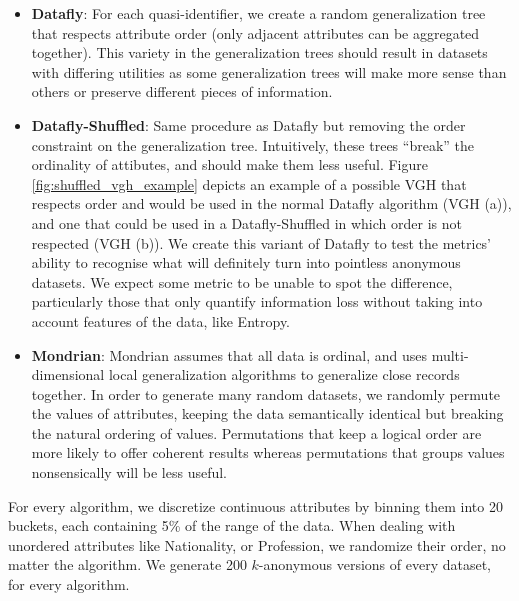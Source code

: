 \begin{itemize}
    \item \textbf{Datafly}: For each quasi-identifier, we create a random generalization tree that respects attribute order (only adjacent attributes can be aggregated together). This variety in the generalization trees should result in datasets with differing utilities as some generalization trees will make more sense than others or preserve different pieces of information.
    
    \item \textbf{Datafly-Shuffled}: Same procedure as Datafly but removing the order constraint on the generalization tree. Intuitively, these trees ``break'' the ordinality of attibutes, and should make them less useful. Figure \ref{fig:shuffled_vgh_example} depicts an example of a possible VGH that respects order and would be used in the normal Datafly algorithm (VGH (a)), and one that could be used in a Datafly-Shuffled in which order is not respected (VGH (b)). We create this variant of Datafly to test the metrics' ability to recognise what will definitely turn into pointless anonymous datasets. We expect some metric to be unable to spot the difference, particularly those that only quantify information loss without taking into account features of the data, like Entropy.
    
    \item \textbf{Mondrian}: Mondrian assumes that all data is ordinal, and uses multi-dimensional local generalization algorithms to generalize close records together. In order to generate many random datasets, we randomly permute the values of attributes, keeping the data semantically identical but breaking the natural ordering of values. Permutations that keep a logical order are more likely to offer coherent results whereas permutations that groups values nonsensically will be less useful.
\end{itemize}

For every algorithm, we discretize continuous attributes by binning them into 20 buckets, each containing 5\% of the range of the data. When dealing with unordered attributes like Nationality, or Profession, we randomize their order, no matter the algorithm. We generate 200 $k$-anonymous versions of every dataset, for every algorithm. 


